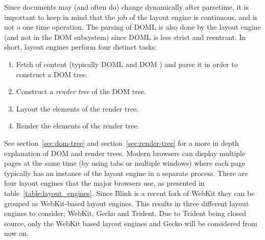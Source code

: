 \documentclass[a4paper,11pt]{kth-mag}
\newcommand\abbr[2][]{\uppercase{#2}\ifthenelse{\equal{#1}{}}%
                     {}{#1}}
\begin{document}
      Since documents may (and often do) change dynamically after parsetime, it is important to keep in mind that the job of the layout engine is continuous, and is not a one time operation.
      The parsing of \abbr{doml} is also done by the layout engine (and not in the \abbr{dom} subsystem) since \abbr{doml} is less strict and reentrant.
      In short, layout engines perform four distinct tasks:
      \begin{enumerate}
        \item Fetch of content (typically \abbr{doml} and \abbr{dom}) and parse it in order to construct a \abbr{dom} tree.
        \item Construct a \emph{render tree} of the \abbr{dom} tree.
        \item Layout the elements of the render tree.
        \item Render the elements of the render tree.
      \end{enumerate}
      See section~\ref{sec:dom-tree} and section~\ref{sec:render-tree} for a more in depth explanation of \abbr{dom} and render trees.
      Modern browsers can display multiple pages at the same time (by using tabs or multiple windows) where each page typically has an instance of the layout engine in a separate process.
      There are four layout engines that the major browsers use, as presented in table~\ref{table:layout_engines}.
      Since Blink is a recent fork of WebKit they can be grouped as WebKit-based layout engines.
      This results in three different layout engines to consider; WebKit, Gecko and Trident.
      Due to Trident being closed source, only the WebKit based layout engines and Gecko will be considered from now on.
\end{document}
